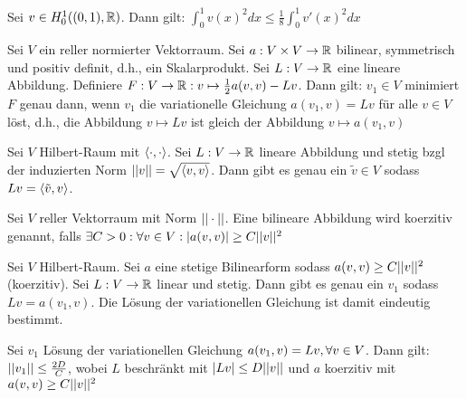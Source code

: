 \begin{satz}
	Sei $v \in H^{1}_0((0,1),\mathbb{R})$. Dann gilt: $\int_{0}^{1} v(x)^2 dx \leq \frac{1}{8} \int_{0}^{1} v'(x)^2 dx$
\end{satz}

\begin{satz}
	Sei $V$ ein reller normierter Vektorraum. Sei $a : V \times V \rightarrow \mathbb{R}$ bilinear, symmetrisch und positiv definit, d.h., ein Skalarprodukt. Sei $L : V \rightarrow \mathbb{R}$ eine lineare Abbildung. Definiere $F : V \rightarrow \mathbb{R} : v \mapsto \frac{1}{2}a(v,v) - Lv$. Dann gilt: $v_1 \in V$ minimiert $F$ genau dann, wenn $v_1$ die variationelle Gleichung $a(v_1, v) = Lv$ für alle $v \in V$ löst, d.h., die Abbildung $v \mapsto Lv$ ist gleich der Abbildung $v \mapsto a(v_1,v)$ 
\end{satz}

\begin{satz}
	Sei $V$ Hilbert-Raum mit $\langle \cdot, \cdot \rangle$. Sei $L : V \rightarrow \mathbb{R}$ lineare Abbildung und stetig bzgl der induzierten Norm $||v|| = \sqrt{\langle v, v \rangle}$. Dann gibt es genau ein $\tilde{v} \in V$ sodass $Lv = \langle \tilde{v}, v \rangle$.
\end{satz}

\begin{definition}
	Sei $V$ reller Vektorraum mit Norm $|| \cdot ||$. Eine bilineare Abbildung wird koerzitiv genannt, falls $\exists C > 0 : \forall v \in V : |a(v,v)| \geq C ||v||^2$
\end{definition}

\begin{satz}
	Sei $V$ Hilbert-Raum. Sei $a$ eine stetige Bilinearform sodass $a(v,v) \geq C ||v||^2$ (koerzitiv). Sei $L : V \rightarrow \mathbb{R}$ linear und stetig. Dann gibt es genau ein $v_1$ sodass $Lv = a(v_1,v)$. Die Lösung der variationellen Gleichung ist damit eindeutig bestimmt.
\end{satz}

\begin{satz}
	Sei $v_1$ Lösung der variationellen Gleichung $a(v_1,v) = Lv, \forall v \in V$. Dann gilt: $||v_1|| \leq \frac{2D}{C}$, wobei $L$ beschränkt mit $|Lv| \leq D ||v||$ und $a$ koerzitiv mit $a(v,v) \geq C ||v||^2 $
\end{satz}

